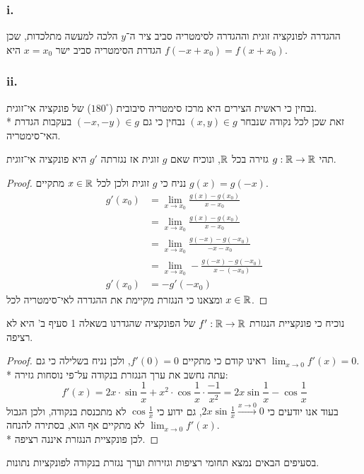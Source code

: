\Question{}
\Subquestion{}
\subsubsection{i.}
ההגדרה לפונקציה זוגית וההגדרה לסימטריה סביב ציר ה־$y$ הלכה למעשה מתלכדות, שכן הגדרת הסימטריה סביב ישר $x = x_0$ היא $f(-x + x_0) = f(x + x_0)$.

\subsubsection{ii.}
נבחין כי ראשית הצירים היא מרכז סימטריה סיבובית ($180^\circ$) של פונקציה אי־זוגית. \\*
זאת שכן לכל נקודה שנבחר $(x, y) \in g$ נבחין כי גם $(-x, -y) \in g$ בעקבות הגדרת האי־סימטריה.

\Subquestion{}
תהי $g : \mathbb{R} \to \mathbb{R}$ גזירה בכל $\mathbb{R}$, ונוכיח שאם $g$ זוגית אז נגזרתה $g'$ היא פונקציה אי־זוגית.
\begin{proof}
	נניח כי $g$ זוגית ולכן לכל $x \in \mathbb{R}$ מתקיים $g(x) = g(-x)$.
	\begin{align*}
		g'(x_0) & = \lim_{x \to x_0} \frac{g(x) - g(x_0)}{x - x_0} \\
				& = \lim_{x \to x_0} \frac{g(x) - g(x_0)}{x - x_0} \\
				& = \lim_{x \to x_0} \frac{g(-x) - g(-x_0)}{-x - x_0} \\
				& = \lim_{x \to x_0} -\frac{g(-x) - g(-x_0)}{x - (-x_0)} \\
		g'(x_0) & = -g'(-x_0)
	\end{align*}
	ומצאנו כי הנגזרת מקיימת את ההגדרה לאי־סימטריה לכל $x \in \mathbb{R}$.
\end{proof}

\Question{}
נוכיח כי פונקציית הנגזרת $f' : \mathbb{R} \to \mathbb{R}$ של הפונקציה שהגדרנו בשאלה 1 סעיף ב' היא לא רציפה.
\begin{proof}
	ראינו קודם כי מתקיים $f'(0) = 0$, ולכן נניח בשלילה כי גם $\lim_{x \to 0} f'(x) = 0$. \\*
	עתה נחשב את ערך הנגזרת בנקודה על־פי נוסחות גזירה:
	\[
		f'(x) = 2x \cdot \sin \frac{1}{x} + x^2 \cdot \cos \frac{1}{x} \cdot \frac{-1}{x^2} = 2x \sin \frac{1}{x} - \cos \frac{1}{x}
	\]
	בעוד אנו יודעים כי $2x \sin \frac{1}{x} \xrightarrow{x \to 0} 0$, גם ידוע כי $\cos \frac{1}{x}$ לא מתכנסת בנקודה, ולכן הגבול $\lim_{x \to 0} f'(x)$ לא מתקיים אף הוא, בסתירה להנחה. \\*
	לכן פונקציית הנגזרת איננה רציפה.
\end{proof}

\Question{}
בסעיפים הבאים נמצא תחומי רציפות וגזירות וערך נגזרת בנקודה לפונקציות נתונות.


